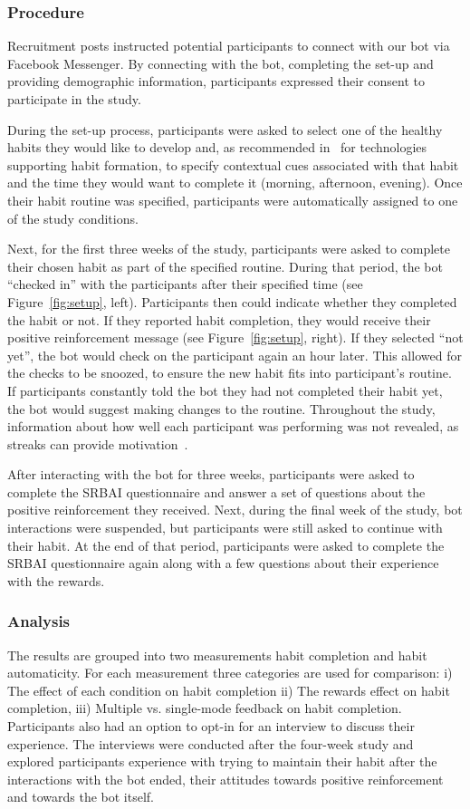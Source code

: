 \documentclass{scaffold/sigchi}
\begin{document}
\subsubsection{Procedure}
Recruitment posts instructed potential participants to connect with our bot via Facebook Messenger. By connecting with the bot, completing the set-up and providing demographic information, participants expressed their consent to participate in the study.

During the set-up process, participants were asked to select one of the healthy habits they would like to develop and, as recommended in~\cite{article_dont_forget_your_pill} for technologies supporting habit formation, to specify contextual cues associated with that habit and the time they would want to complete it (morning, afternoon, evening). Once their habit routine was specified, participants were automatically assigned to one of the study conditions. 

Next, for the first three weeks of the study, participants were asked to complete their chosen habit as part of the specified routine. During that period, the bot ``checked in'' with the participants after their specified time (see Figure~\ref{fig:setup}, left). Participants then could indicate whether they completed the habit or not. If they reported habit completion, they would receive their positive reinforcement message (see Figure~\ref{fig:setup}, right). If they selected ``not yet'', the bot would check on the participant again an hour later. This allowed for the checks to be snoozed, to ensure the new habit fits into participant's routine. If participants constantly told the bot they had not completed their habit yet, the bot would suggest making changes to the routine. Throughout the study, information about how well each participant was performing was not revealed, as streaks can provide motivation~\cite{article_dont_kick_habit}. 

After interacting with the bot for three weeks, participants were asked to complete the SRBAI questionnaire and answer a set of questions about the positive reinforcement they received. Next, during the final week of the study, bot interactions were suspended, but participants were still asked to continue with their habit. At the end of that period, participants were asked to complete the SRBAI questionnaire again along with a few questions about their experience with the rewards. 

\subsubsection{Analysis}
The results are grouped into two measurements habit completion and habit automaticity. For each measurement three categories are used for comparison: i) The effect of each condition on habit completion ii) The rewards effect on habit completion, iii) Multiple vs. single-mode feedback on habit completion. Participants also had an option to opt-in for an interview to discuss their experience. The interviews were conducted after the four-week study and explored participants experience with trying to maintain their habit after the interactions with the bot ended, their attitudes towards positive reinforcement and towards the bot itself. 
\end{document}
